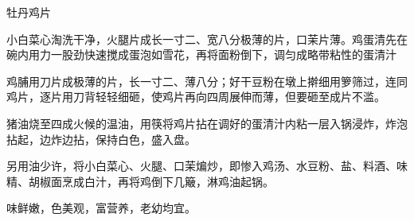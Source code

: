 \begin{recipe}{牡丹鸡片}

\ingredients


\preparation

\step 小白菜心淘洗干净，火腿片成长一寸二、宽八分极薄的片，口茉片薄。鸡蛋清先在
碗内用力一股劲快速搅成蛋泡如雪花，再将面粉倒下，调匀成略带粘性的蛋清汁

\step 鸡脯用刀片成极薄的片，长一寸二、薄八分；好干豆粉在墩上擀细用箩筛过，连同
鸡片，逐片用刀背轻轻细砸，使鸡片再向四周展伸而薄，但要砸至成片不滥。

\step 猪油烧至四成火候的温油，用筷将鸡片拈在调好的蛋清汁内粘一层入锅浸炸，炸泡
拈起，边炸边拈，保持白色，盛入盘。

\step 另用油少许，将小白菜心、火腿、口茉煸炒，即惨入鸡汤、水豆粉、盐、料酒、味
精、胡椒面烹成白汁，再将鸡倒下几簸，淋鸡油起锅。

\features

味鲜嫩，色美观，富营养，老幼均宜。

\end{recipe}

